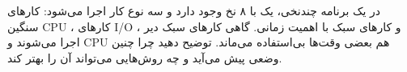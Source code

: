 \question[12] 
در یک برنامه چندنخی، یک  با ۸ نخ وجود دارد و سه نوع کار اجرا می‌شود:  
کارهای سنگین 
CPU
، کارهای 
I/O
، و کارهای سبک با اهمیت زمانی.  
گاهی کارهای سبک دیر اجرا می‌شوند و CPU هم بعضی وقت‌ها بی‌استفاده می‌ماند.  
توضیح دهید چرا چنین وضعی پیش می‌آید و چه روش‌هایی می‌تواند آن را بهتر کند.
